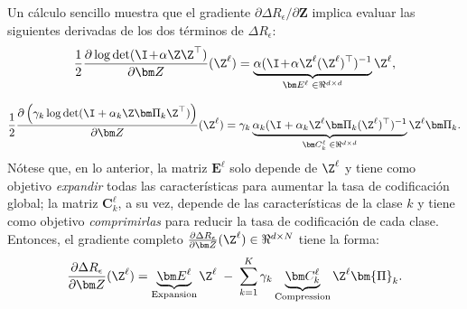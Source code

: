 \documentclass[../../book-main.tex]{subfiles}
\begin{document}
Un cálculo sencillo muestra que el gradiente ${\partial \Delta
R_{\epsilon}}/{\partial \bm Z}$ implica evaluar las siguientes
derivadas de los dos términos de $\Delta R_{\epsilon}$:
\begin{equation}\label{eqn:expand-directions}
    \frac{1}{2}\frac{\partial \log \det (\I \!+\! \alpha \Z \Z^{\top}
    )}{\partial \bm Z}(\Z^\ell) = \underbrace{\alpha(\I \!+\!
    \alpha\Z^\ell (\Z^\ell)^\top)^{-1}}_{\bm E^{\ell} \; \in
    \Re^{d\times d}}\Z^\ell,
\end{equation}

\begin{equation}\label{eqn:compress-directions}
    \scalebox{0.925}{\(\displaystyle\frac{1}{2}\frac{\partial \left(
                    \gamma_{k}  \log \det (\I +
            \alpha_{k} \Z \bm \Pi_k \Z^{\top} )  \right)}{\partial \bm
            Z}(\Z^\ell) = \gamma_{k}  \underbrace{ \alpha_{k}  (\I +
            \alpha_{k} \Z^\ell \bm \Pi_k (\Z^\ell)^{\top})^{-1}}_{\bm
    C^{\ell}_k \; \in \Re^{d\times d}} \Z^{\ell} \bm \Pi_k\)}.
\end{equation}
Nótese que, en lo anterior, la matriz $\bm E^{\ell}$ solo depende de
$\Z^{\ell}$ y tiene como objetivo {\em expandir} todas las características para aumentar
la tasa de codificación global; la matriz $\bm C^{\ell}_{k}$, a su vez, depende de
las características de la clase $k$ y tiene como objetivo {\em comprimirlas} para reducir
la tasa de codificación de cada clase.
Entonces, el gradiente completo $\frac{\partial \Delta
R_{\epsilon}}{\partial \bm Z}(\Z^\ell) \in \Re^{d\times N}$ tiene la  forma:
\begin{equation}
    \frac{\partial \Delta R_{\epsilon}}{\partial \bm Z}(\Z^\ell)  =
    \underbrace{\bm E^{\ell}}_{\text{Expansion}} \Z^{\ell} \;-\;
    \sum_{k=1}^K \gamma_{k} \underbrace{\bm
    C_{k}^{\ell}}_{\text{Compression}}  \Z^{\ell} \bm{\Pi}_k.
    \label{eqn:DR-gradient}
\end{equation}
\end{document}
